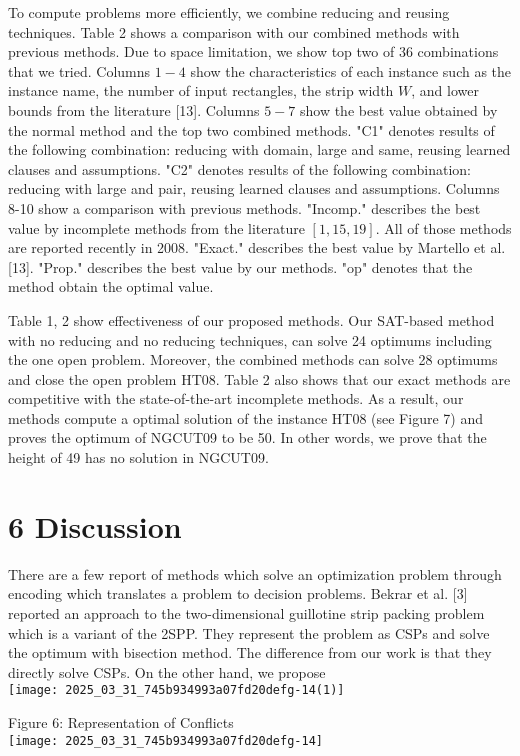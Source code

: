 \documentclass[10pt]{article}
\begin{document}
To compute problems more efficiently, we combine reducing and reusing techniques. Table 2 shows a comparison with our combined methods with previous methods. Due to space limitation, we show top two of 36 combinations that we tried. Columns $1-4$ show the characteristics of each instance such as the instance name, the number of input rectangles, the strip width $W$, and lower bounds from the literature [13]. Columns $5-7$ show the best value obtained by the normal method and the top two combined methods. "C1" denotes results of the following combination: reducing with domain, large and same, reusing learned clauses and assumptions. "C2" denotes results of the following combination: reducing with large and pair, reusing learned clauses and assumptions. Columns 8-10 show a comparison with previous methods. "Incomp." describes the best value by incomplete methods from the literature $[1,15,19]$. All of those methods are reported recently in 2008. "Exact." describes the best value by Martello et al. [13]. "Prop." describes the best value by our methods. "op" denotes that the method obtain the optimal value.

Table 1, 2 show effectiveness of our proposed methods. Our SAT-based method with no reducing and no reducing techniques, can solve 24 optimums including the one open problem. Moreover, the combined methods can solve 28 optimums and close the open problem HT08. Table 2 also shows that our exact methods are competitive with the state-of-the-art incomplete methods. As a result, our methods compute a optimal solution of the instance HT08 (see Figure 7) and proves the optimum of NGCUT09 to be 50. In other words, we prove that the height of 49 has no solution in NGCUT09.

\section*{6 Discussion}
There are a few report of methods which solve an optimization problem through encoding which translates a problem to decision problems. Bekrar et al. [3] reported an approach to the two-dimensional guillotine strip packing problem which is a variant of the 2SPP. They represent the problem as CSPs and solve the optimum with bisection method. The difference from our work is that they directly solve CSPs. On the other hand, we propose\\
\texttt{[image: 2025\_03\_31\_745b934993a07fd20defg-14(1)]}

Figure 6: Representation of Conflicts\\
\texttt{[image: 2025\_03\_31\_745b934993a07fd20defg-14]}
\end{document}
